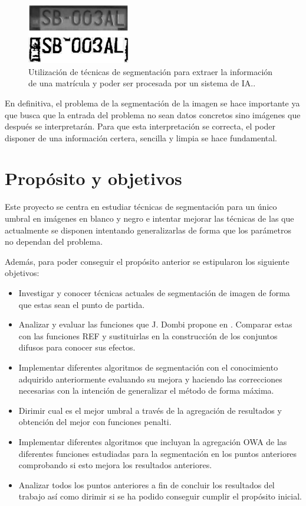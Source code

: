 \documentclass[main]{subfiles}
\begin{document}
\begin{figure}
\centering
	\includegraphics[width=0.4\textwidth]{img/matricula.eps}
	\caption{Utilización de técnicas de segmentación para extraer la información de una matrícula y poder ser procesada por un sistema de IA.\cite{lib:matricula}.}
	\label{img:matricula}
\end{figure}

En definitiva, el problema de la segmentación de la imagen se hace importante ya que busca que la entrada del problema no sean datos concretos sino imágenes que después se interpretarán. Para que esta interpretación se correcta, el poder disponer de una información certera, sencilla y limpia se hace fundamental.




\section{Propósito y objetivos}\label{sec:objetivos}

Este proyecto se centra en estudiar técnicas de segmentación para un único umbral en imágenes en blanco y negro e intentar mejorar las técnicas de las que actualmente se disponen intentando generalizarlas de forma que los parámetros no dependan del problema.

Además, para poder conseguir el propósito anterior se estipularon los siguiente objetivos:
\begin{itemize}
	\item Investigar y conocer técnicas actuales de segmentación de imagen de forma que estas sean el punto de partida.
	\item Analizar y evaluar las funciones que J. Dombi propone en \cite{art:dombi}. Comparar estas con las funciones REF y sustituirlas en la construcción de los conjuntos difusos para conocer sus efectos.
	\item Implementar diferentes algoritmos de segmentación con el conocimiento adquirido anteriormente evaluando su mejora y haciendo las correcciones necesarias con la intención de generalizar el método de forma máxima.
	\item Dirimir cual es el mejor umbral a través de la agregación de resultados y obtención del mejor con funciones penalti.
	\item Implementar diferentes algoritmos que incluyan la agregación OWA de las diferentes funciones estudiadas para la segmentación en los puntos anteriores comprobando si esto mejora los resultados anteriores.
	\item Analizar todos los puntos anteriores a fin de concluir los resultados del trabajo así como dirimir si se ha podido conseguir cumplir el propósito inicial.
\end{itemize}
\end{document}
